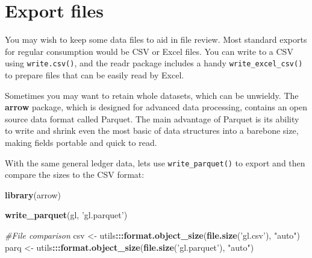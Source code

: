 \documentclass[
]{book}
\newenvironment{Shaded}{\begin{snugshade}}{\end{snugshade}}
\newcommand{\CommentTok}[1]{\textcolor[rgb]{0.56,0.35,0.01}{\textit{#1}}}
\newcommand{\DataTypeTok}[1]{\textcolor[rgb]{0.13,0.29,0.53}{#1}}
\newcommand{\KeywordTok}[1]{\textcolor[rgb]{0.13,0.29,0.53}{\textbf{#1}}}
\newcommand{\NormalTok}[1]{#1}
\newcommand{\OperatorTok}[1]{\textcolor[rgb]{0.81,0.36,0.00}{\textbf{#1}}}
\newcommand{\StringTok}[1]{\textcolor[rgb]{0.31,0.60,0.02}{#1}}
\begin{document}
\hypertarget{export-files}{%
\section{Export files}\label{export-files}}

You may wish to keep some data files to aid in file review. Most standard exports for regular consumption would be CSV or Excel files. You can write to a CSV using \texttt{write.csv()}, and the readr package includes a handy \texttt{write\_excel\_csv()} to prepare files that can be easily read by Excel.

\begin{Shaded}
\end{Shaded}

Sometimes you may want to retain whole datasets, which can be unwieldy. The \textbf{arrow} package, which is designed for advanced data processing, contains an open source data format called Parquet. The main advantage of Parquet is its ability to write and shrink even the most basic of data structures into a barebone size, making fields portable and quick to read.

With the same general ledger data, lets use \texttt{write\_parquet()} to export and then compare the sizes to the CSV format:

\begin{Shaded}
\begin{Highlighting}[]
\KeywordTok{library}\NormalTok{(arrow)}

\KeywordTok{write_parquet}\NormalTok{(gl, }\StringTok{'gl.parquet'}\NormalTok{)}

\CommentTok{#File comparison}
\NormalTok{csv <-}\StringTok{ }\NormalTok{utils}\OperatorTok{:::}\KeywordTok{format.object_size}\NormalTok{(}\KeywordTok{file.size}\NormalTok{(}\StringTok{'gl.csv'}\NormalTok{), }\StringTok{"auto"}\NormalTok{)}
\NormalTok{parq <-}\StringTok{ }\NormalTok{utils}\OperatorTok{:::}\KeywordTok{format.object_size}\NormalTok{(}\KeywordTok{file.size}\NormalTok{(}\StringTok{'gl.parquet'}\NormalTok{), }\StringTok{"auto"}\NormalTok{)}
\end{Highlighting}
\end{Shaded}
\end{document}
